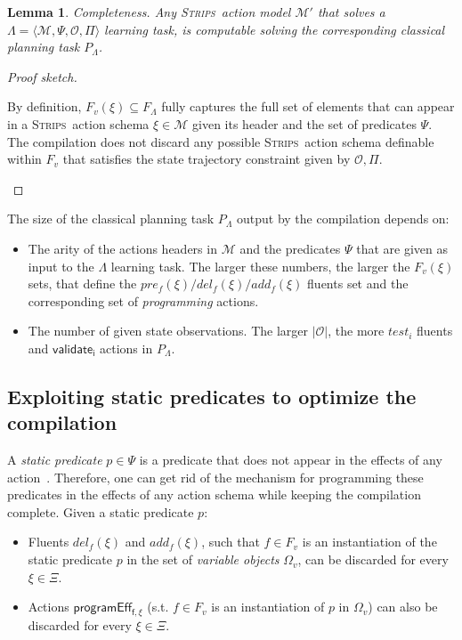 \documentclass[3p,times]{elsarticle}
\newtheorem{mylemma}[mytheorem]{Lemma}
\newcommand{\strips}{\textsc{Strips}}     %
\newcommand{\tup}[1]{{\langle #1 \rangle}}
\begin{document}
\begin{mylemma}
Completeness. Any \strips\ action model $\mathcal{M}'$ that solves a $\Lambda=\tup{\mathcal{M},\Psi,\mathcal{O},\Pi}$ learning task, is computable solving the corresponding classical planning task $P_{\Lambda}$.
\end{mylemma}

\begin{proof}[Proof sketch]
\begin{small}
By definition, $F_v(\xi)\subseteq F_\Lambda$ fully captures the full set of elements that can appear in a \strips\ action schema $\xi\in\mathcal{M}$ given its header and the set of predicates $\Psi$. The compilation does not discard any possible \strips\ action schema definable within $F_v$ that satisfies the state trajectory constraint given by $\mathcal{O},\Pi$.
\end{small}
\end{proof}

The size of the classical planning task $P_{\Lambda}$ output by the compilation depends on:
\begin{itemize}
\item The arity of the actions headers in $\mathcal{M}$ and the predicates $\Psi$ that are given as input to the $\Lambda$ learning task. The larger these numbers, the larger the $F_v(\xi)$ sets, that define the $pre_f(\xi)/del_f(\xi)/add_f(\xi)$ fluents set and the corresponding set of {\em programming} actions. 
\item The number of given state observations. The larger $|\mathcal{O}|$, the more $test_i$ fluents and $\mathsf{validate_{i}}$ actions in $P_{\Lambda}$.
\end{itemize}


\subsection{Exploiting static predicates to optimize the compilation}
A {\em static predicate} $p \in \Psi$ is a predicate that does not appear in the effects of any action~\cite{fox:TIM:JAIR1998}. Therefore, one can get rid of the mechanism for programming these predicates in the effects of any action schema while keeping the compilation complete. Given a static predicate $p$:
\begin{itemize}
\item Fluents $del_f(\xi)$ and $add_f(\xi)$, such that $f\in F_v$ is an instantiation of the static predicate $p$ in the set of {\em variable objects} $\Omega_v$, can be discarded for every $\xi\in\Xi$.
\item Actions $\mathsf{programEff_{f,\xi}}$ (s.t. $f\in F_v$ is an instantiation of $p$ in $\Omega_v$) can also be discarded for every $\xi\in\Xi$.
\end{itemize}
\end{document}
